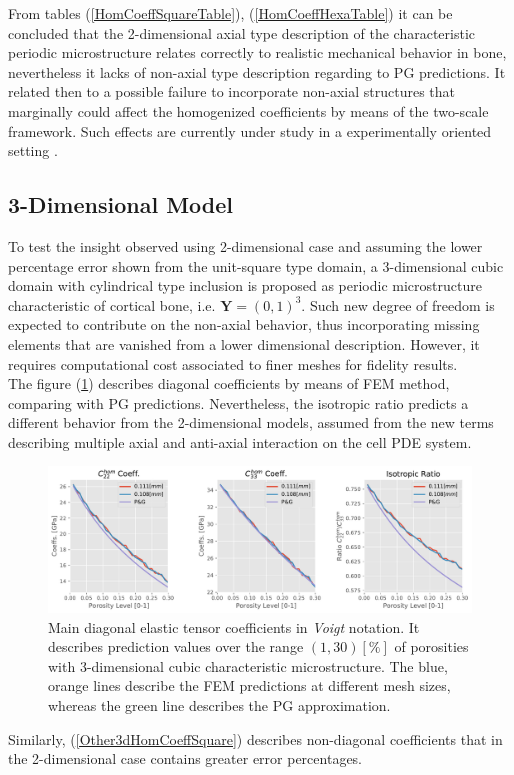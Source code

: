 From tables (\ref{HomCoeffSquareTable}), (\ref{HomCoeffHexaTable}) it can be concluded that the 2-dimensional axial type description of the characteristic periodic microstructure relates correctly to realistic mechanical behavior in bone, nevertheless it lacks of non-axial type description regarding to PG predictions. It related then to a possible failure to incorporate non-axial structures that marginally could affect the homogenized coefficients by means of the two-scale framework. Such effects are currently under study in a experimentally oriented setting \cite{Cai2019}.

\subsection{3-Dimensional Model}
To test the insight observed using 2-dimensional case and assuming the lower percentage error shown from the unit-square type domain, a 3-dimensional cubic domain with cylindrical type inclusion is proposed as periodic microstructure characteristic of cortical bone, i.e. $\mathbf{Y} = (0,1)^3$. Such new degree of freedom is expected to contribute on the non-axial behavior, thus incorporating missing elements that are vanished from a lower dimensional description. However, it requires computational cost associated to finer meshes for fidelity results. \\

The figure (\ref{Main3dHomCoeffSquare}) describes diagonal coefficients by means of FEM method, comparing with PG predictions. Nevertheless, the isotropic ratio predicts a different behavior from the 2-dimensional models, assumed from the new terms describing multiple axial and anti-axial interaction on the cell PDE system. 
\begin{figure}[!h]
	\centering
	\includegraphics[scale=.5]{images/CellsProb/3DCellProb_MainHomCoeffsCircular.pdf}
	\caption{Main diagonal elastic tensor coefficients in \textit{Voigt} notation. It describes prediction values over the range $(1,30) [\%]$ of porosities with 3-dimensional cubic characteristic microstructure. The blue, orange lines describe the FEM predictions at different mesh sizes, whereas the green line describes the PG approximation.}
	\label{Main3dHomCoeffSquare}
\end{figure}
Similarly, (\ref{Other3dHomCoeffSquare}) describes non-diagonal coefficients that in the 2-dimensional case contains greater error percentages. 

